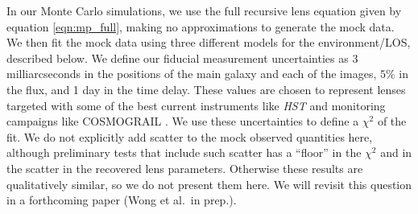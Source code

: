 In our Monte Carlo simulations, we use the full recursive lens equation given by equation \ref{eqn:mp_full}, making no approximations to generate the mock data. We then fit the mock data using three different models for the environment/LOS, described below. We define our fiducial measurement uncertainties as 3 milliarcseconds in the positions of the main galaxy and each of the images, $5\%$ in the flux, and 1 day in the time delay. These values are chosen to represent lenses targeted with some of the best current instruments like \textit{HST} and monitoring campaigns like COSMOGRAIL \citep{Eigenbrod05}. We use these uncertainties to define a $\chi^2$ of the fit. We do not explicitly add scatter to the mock observed quantities here, although preliminary tests that include such scatter has a ``floor'' in the $\chi^2$ and in the scatter in the recovered lens parameters. Otherwise these results are qualitatively similar, so we do not present them here. We will revisit this question in a forthcoming paper (Wong et al.\ in prep.).
  